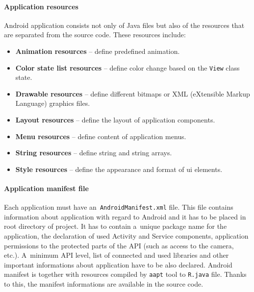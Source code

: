 \paragraph{Application resources}
Android application consists not only of Java files but also of the resources that are separated from the source code.
These resources include:

\begin{itemize}
    \item \textbf{Animation resources} -- define predefined animation.
    \item \textbf{Color state list resources} -- define color change based on the \texttt{View} class state.
    \item \textbf{Drawable resources} -- define different bitmaps or XML (eXtensible Markup Language) graphics files.
    \item \textbf{Layout resources} -- define the layout of application components.
    \item \textbf{Menu resources} -- define content of application menus.
    \item \textbf{String resources} -- define string and string arrays.
    \item \textbf{Style resources} -- define the appearance and format of ui elements.
\end{itemize}

\paragraph{Application manifest file}
Each application must have an~\texttt{AndroidManifest.xml} file. This file contains information about application with
regard to Android and it has to be placed in root directory of project. It has to contain a~unique package name for the
application, the declaration of used Activity and Service components, application permissions to the protected parts of
the API (such as access to the camera, etc.). A~minimum API level, list of connected and used libraries and other
important informations about application have to be also declared. Android manifest is together with resources compiled
by \texttt{aapt} tool to \texttt{R.java} file. Thanks to this, the manifest informations are available in the source
code.

